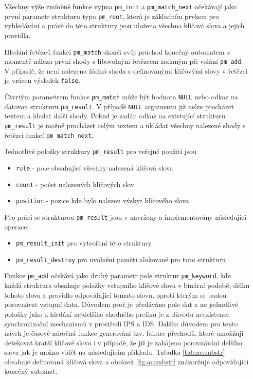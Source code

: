 Všechny výše zmíněné funkce vyjma \texttt{pm\_init} a \texttt{pm\_match\_next} očekávají jako první parametr strukturu typu \texttt{pm\_root},
která je základním prvkem pro vyhledávání a právě do této struktury
jsou uložena všechna klíčová slova a jejich pravidla.

Hledání řetězců funkcí \texttt{pm\_match} skončí svůj průchod konečný automatem v momentě nálezu první shody
s libovolným řetězcem zadaným při volání \texttt{pm\_add}.
V případě, že není nalezena žádná shoda
s definovanými klíčovými slovy v řetězci je vrácen výsledek \texttt{false}.

Čtvrtým parametrem funkce \texttt{pm\_match} může být hodnota \texttt{NULL} nebo odkaz na datovou strukturu
\texttt{pm\_result}. V případě \texttt{NULL} argumentu již nelze procházet textem a hledat další shody.
Pokud je zadán odkaz na existující strukturu \texttt{pm\_result} je možné procházet celým textem a ukládat
všechny nalezené shody s řetězci funkcí \texttt{pm\_match\_next}.

Jednotlivé položky struktury \texttt{pm\_result} pro veřejné použití jsou

\begin{itemize}
    \item{\texttt{rule} - pole obsahující všechny nalezená klíčová slova}
    \item{\texttt{count} - počet nalezených klíčových slov}
    \item{\texttt{position} - pozice kde bylo nalezen výskyt klíčového slova}
\end{itemize}

Pro práci se strukturou \texttt{pm\_result} jsou v navrženy a implementovány následující operace:

\begin{itemize}
    \item{\texttt{pm\_result\_init} pro vytvoření této struktury}
    \item{\texttt{pm\_result\_destroy} pro uvolnění paměti alokované pro tuto strukturu}
\end{itemize}


Funkce \texttt{pm\_add} očekává jako druhý parametr pole struktur \texttt{pm\_keyword}, kde každá struktura
obsahuje položky vstupního klíčové slova v binární podobě, délku tohoto slova a pravidlo odpovídající tomuto slovu, oproti kterým se budou porovnávat vstupní data. Důvodem proč je předáváno pole dat a ne jednotlivé položky
jako u hledání nejdelšího shodného prefixu je z důvodu neexistence synchronizační mechanismů
v prostředí IPS a IDS. Dalším důvodem pro tento návrh je časově náročná funkce generování
tzv. failure přechodů, které umožňují detekovat kratší klíčové slovo i v případě, že již je
zahájeno porovnávání delšího slova jak je možno vidět na následujícím příkladu. Tabulka \ref{tab:ac:substr}
obsahuje definovaná klíčová slova a obrázek \ref{fig:ac:substr} znázorňuje odpovídající konečný automat.

